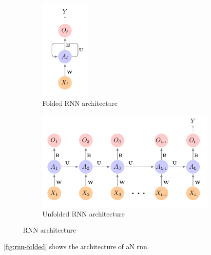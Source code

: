 \documentclass[12pt]{article}
\begin{document}
\begin{figure}
  \begin{subfigure}{0.45\columnwidth}
    \centering
    \begin{adjustbox}
      \includegraphics[height=5cm]{texfiles/figures/rnn-folded.png}
    \end{adjustbox}
    \caption{Folded RNN architecture}
    \label{}
  \end{subfigure}
  \begin{subfigure}{0.45\columnwidth}
    \centering
    \begin{adjustbox}
      \includegraphics[height=5cm]{texfiles/figures/rnn-unfolded.png}
    \end{adjustbox}
    \caption{Unfolded RNN architecture}
    \label{fig:rnn-unfolded}
  \end{subfigure}
  \caption{RNN architecture \cite{james_deep_2023}}
  \label{fig:rnn-arch}
\end{figure}

\cref{fig:rnn-folded} shows the architecture of aN \gls{rnn}. 
\end{document}
